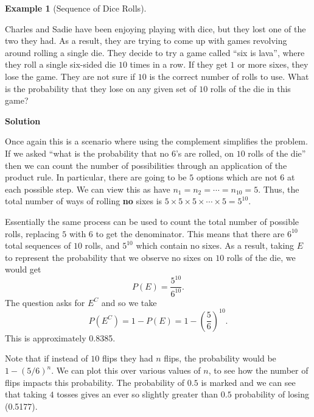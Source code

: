 \documentclass[
  letterpaper,
  DIV=11,
  numbers=noendperiod]{scrreprt}
\theoremstyle{definition}
\theoremstyle{definition}
\newtheorem{example}{Example}[chapter]
\theoremstyle{definition}
\theoremstyle{remark}
\begin{document}
\begin{example}[Sequence of Dice
Rolls]\protect\hypertarget{exm-rolling-sequence-of-dice}{}\label{exm-rolling-sequence-of-dice}

Charles and Sadie have been enjoying playing with dice, but they lost
one of the two they had. As a result, they are trying to come up with
games revolving around rolling a single die. They decide to try a game
called ``six is lava'', where they roll a single six-sided die \(10\)
times in a row. If they get \(1\) or more sixes, they lose the game.
They are not sure if \(10\) is the correct number of rolls to use. What
is the probability that they lose on any given set of \(10\) rolls of
the die in this game?

\begin{tcolorbox}[enhanced jigsaw, colback=white, colframe=quarto-callout-color-frame, arc=.35mm, leftrule=.75mm, rightrule=.15mm, opacityback=0, breakable, bottomrule=.15mm, left=2mm, toprule=.15mm]

\vspace{-3mm}\textbf{Solution}\vspace{3mm}

Once again this is a scenario where using the complement simplifies the
problem. If we asked ``what is the probability that no 6's are rolled,
on \(10\) rolls of the die'' then we can count the number of
possibilities through an application of the product rule. In particular,
there are going to be \(5\) options which are not \(6\) at each possible
step. We can view this as have \(n_1 = n_2 = \cdots = n_{10} = 5\).
Thus, the total number of ways of rolling \textbf{no} sixes is
\(5\times5\times5\times\cdots\times5 = 5^{10}\).

Essentially the same process can be used to count the total number of
possible rolls, replacing \(5\) with \(6\) to get the denominator. This
means that there are \(6^{10}\) total sequences of \(10\) rolls, and
\(5^{10}\) which contain no sixes. As a result, taking \(E\) to
represent the probability that we observe no sixes on \(10\) rolls of
the die, we would get \[P(E) = \frac{5^{10}}{6^{10}}.\] The question
asks for \(E^C\) and so we take
\[P(E^C) = 1 - P(E) = 1 - \left(\frac{5}{6}\right)^{10}.\] This is
approximately 0.8385.

Note that if instead of \(10\) flips they had \(n\) flips, the
probability would be \(1 - \left(5/6\right)^n\). We can plot this over
various values of \(n\), to see how the number of flips impacts this
probability. The probability of \(0.5\) is marked and we can see that
taking \(4\) tosses gives an ever so slightly greater than \(0.5\)
probability of losing (0.5177).


\end{tcolorbox}
\end{example}
\end{document}
